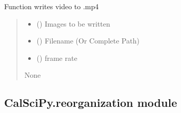 \documentclass[letterpaper,10pt,english]{sphinxmanual}
\begin{document}
\begin{fulllineitems}
\label{\detokenize{CalSciPy.io:CalSciPy.io.save_video}}
\pysigstartsignatures
{}
\pysigstopsignatures
\sphinxAtStartPar
Function writes video to .mp4
\begin{quote}\begin{description}
\begin{itemize}
\item {} 
\sphinxAtStartPar
{} () \sphinxhyphen{}\sphinxhyphen{} Images to be written

\item {} 
\sphinxAtStartPar
{} (\sphinxstyleliteralemphasis{\sphinxupquote{{[}}}\sphinxstyleliteralemphasis{\sphinxupquote{, }}\sphinxstyleliteralemphasis{\sphinxupquote{{]}}}) \sphinxhyphen{}\sphinxhyphen{} Filename  (Or Complete Path)

\item {} 
\sphinxAtStartPar
{} (\sphinxstyleliteralemphasis{\sphinxupquote{{[}}}\sphinxstyleliteralemphasis{\sphinxupquote{, }}\sphinxstyleliteralemphasis{\sphinxupquote{{]}}}) \sphinxhyphen{}\sphinxhyphen{} frame rate

\end{itemize}

\sphinxAtStartPar
None

\end{description}\end{quote}

\end{fulllineitems}


\sphinxstepscope


\subsection{CalSciPy.reorganization module}
\label{\detokenize{CalSciPy.reorganization:module-CalSciPy.reorganization}}\label{\detokenize{CalSciPy.reorganization:calscipy-reorganization-module}}\label{\detokenize{CalSciPy.reorganization::doc}}
\end{document}
